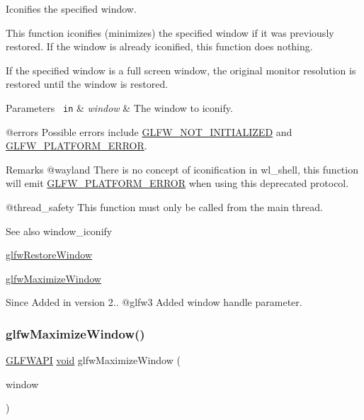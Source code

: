 Iconifies the specified window. 

This function iconifies (minimizes) the specified window if it was previously restored. If the window is already iconified, this function does nothing.

If the specified window is a full screen window, the original monitor resolution is restored until the window is restored.


\begin{DoxyParams}[1]{Parameters}
\mbox{\texttt{ in}}  & {\em window} & The window to iconify.\\
\hline
\end{DoxyParams}
@errors Possible errors include \mbox{\hyperlink{group__errors_ga2374ee02c177f12e1fa76ff3ed15e14a}{G\+L\+F\+W\+\_\+\+N\+O\+T\+\_\+\+I\+N\+I\+T\+I\+A\+L\+I\+Z\+ED}} and \mbox{\hyperlink{group__errors_gad44162d78100ea5e87cdd38426b8c7a1}{G\+L\+F\+W\+\_\+\+P\+L\+A\+T\+F\+O\+R\+M\+\_\+\+E\+R\+R\+OR}}.

\begin{DoxyRemark}{Remarks}
@wayland There is no concept of iconification in wl\+\_\+shell, this function will emit \mbox{\hyperlink{group__errors_gad44162d78100ea5e87cdd38426b8c7a1}{G\+L\+F\+W\+\_\+\+P\+L\+A\+T\+F\+O\+R\+M\+\_\+\+E\+R\+R\+OR}} when using this deprecated protocol.
\end{DoxyRemark}
@thread\+\_\+safety This function must only be called from the main thread.

\begin{DoxySeeAlso}{See also}
window\+\_\+iconify 

\mbox{\hyperlink{group__window_ga1e29caf0b819f578b04db52fff17256c}{glfw\+Restore\+Window}} 

\mbox{\hyperlink{group__window_ga4f825a55367d3fabde3d06e7f30128e8}{glfw\+Maximize\+Window}}
\end{DoxySeeAlso}
\begin{DoxySince}{Since}
Added in version 2.. @glfw3 Added window handle parameter. 
\end{DoxySince}
\mbox{\label{group__window_ga4f825a55367d3fabde3d06e7f30128e8}} 
\subsubsection{\texorpdfstring{glfwMaximizeWindow()}{glfwMaximizeWindow()}}
{\footnotesize\ttfamily \mbox{\hyperlink{glfw3_8h_a56da5036b2cc259351ae22fd6439bb47}{G\+L\+F\+W\+A\+PI}} \mbox{\hyperlink{glad_8h_a950fc91edb4504f62f1c577bf4727c29}{void}} glfw\+Maximize\+Window (\begin{DoxyParamCaption}\item[{\mbox{\hyperlink{group__window_ga3c96d80d363e67d13a41b5d1821f3242}{G\+L\+F\+Wwindow}} $\ast$}]{window }\end{DoxyParamCaption})}



